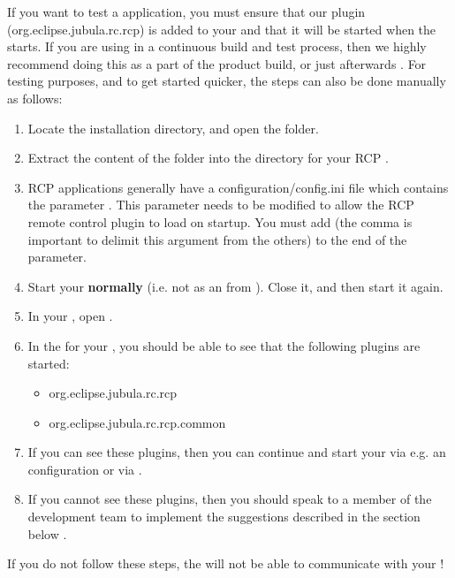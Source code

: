 
If you want to test a  application, you must ensure that our  plugin (org.eclipse.jubula.rc.rcp) is added to your \gdaut{} and that it will be started when the \gdaut{} starts. If you are using \app{} in a continuous build and test process, then we highly recommend doing this as a part of the product build, or just afterwards . For testing purposes, and to get started quicker, the steps can also be done manually as follows:


\begin{enumerate}
\item Locate the \app{} installation directory, and open the  folder.
\item Extract the content of the  folder into the  directory for your RCP \gdaut{}.
\item RCP applications generally have a configuration/config.ini file which contains the parameter . This parameter needs to be modified to allow the RCP remote control plugin to load on \gdaut{} startup. You must add   (the comma is important to delimit this argument from the others) to the end of the  parameter.
\item Start your \gdaut{} \textbf{normally} (i.e. not as an \gdaut{} from \app{}). Close it, and then start it again. 
\item In your \gdaut{}, open . 
\item In the  for your \gdaut{}, you should be able to see that the following plugins are started:
\begin{itemize}
\item org.eclipse.jubula.rc.rcp
\item org.eclipse.jubula.rc.rcp.common
\end{itemize}
\item If you can see these plugins, then you can continue and start your \gdaut{} via e.g. an \gdaut{} configuration  or via  . 
\item If you cannot see these plugins, then you should speak to a member of the development team to implement the suggestions described in the section below .
\end{enumerate}
If you do not follow these steps, the \gdagent{} will not be able to communicate with your \gdaut{}!

